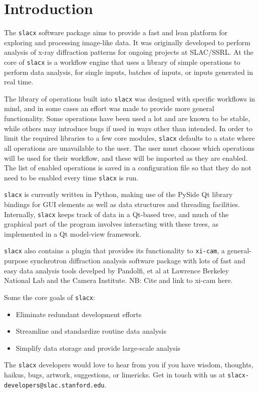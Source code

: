 \section{Introduction}
\label{sec:introduction}

The \verb|slacx| software package aims to provide 
a fast and lean platform for exploring and processing image-like data.
It was originally developed to perform analysis of x-ray diffraction patterns 
for ongoing projects at SLAC/SSRL.
At the core of \verb|slacx| is a workflow engine
that uses a library of simple operations
to perform data analysis, for single inputs, 
batches of inputs, or inputs generated in real time. 

The library of operations built into \verb|slacx|
was designed with specific workflows in mind,
and in some cases an effort was made to provide more general functionality.
Some operations have been used a lot and are known to be stable,
while others may introduce bugs if used in ways other than intended.
In order to limit the required libraries to a few core modules,
\verb|slacx| defaults to a state where all operations are unavailable to the user.
The user must choose which operations will be used for their workflow,
and these will be imported as they are enabled.
The list of enabled operations is saved in a configuration file
so that they do not need to be enabled every time \verb|slacx| is run.

\verb|slacx| is currently written in Python,
making use of the PySide Qt library bindings
for GUI elements as well as data structures and threading facilities.
Internally, \verb|slacx| keeps track of data in a Qt-based tree,
and much of the graphical part of the program involves 
interacting with these trees,
as implemented in a Qt model-view framework.

\verb|slacx| also contains a plugin that provides its functionality to \verb|xi-cam|,
a general-purpose synchrotron diffraction analysis software package
with lots of fast and easy data analysis tools
develped by Pandolfi, et al at Lawrence Berkeley National Lab and the Camera Institute.
NB: Cite and link to xi-cam here.

Some the core goals of \verb|slacx|:
\begin{itemize}
\item Eliminate redundant development efforts 
\item Streamline and standardize routine data analysis
\item Simplify data storage and provide large-scale analysis 
\end{itemize}

The \verb|slacx| developers would love to hear from you
if you have wisdom, thoughts, haikus, bugs, artwork, suggestions, or limericks.
Get in touch with us at \verb|slacx-developers@slac.stanford.edu|.




